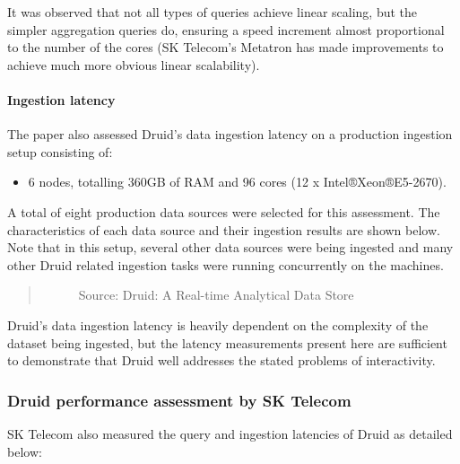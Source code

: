 \documentclass[letterpaper,10pt,english]{sphinxmanual}
\begin{document}
It was observed that not all types of queries achieve linear scaling, but the simpler aggregation queries do, ensuring a speed increment almost proportional to the number of the cores (SK Telecom’s Metatron has made improvements to achieve much more obvious linear scalability).


\paragraph{Ingestion latency}
\label{\detokenize{discovery/part01/druid_tests:ingestion-latency}}
The paper also assessed Druid’s data ingestion latency on a production ingestion setup consisting of:
\begin{itemize}
\item {} 
6 nodes, totalling 360GB of RAM and 96 cores (12 x Intel®Xeon®E5-2670).

\end{itemize}

A total of eight production data sources were selected for this assessment. The characteristics of each data source and their ingestion results are shown below. Note that in this setup, several other data sources were being ingested and many other Druid related ingestion tasks were running concurrently on the machines.
\begin{quote}

\begin{figure}[H]
\centering
\capstart

\noindent{}
\caption{Source: Druid: A Real-time Analytical Data Store}\label{\detokenize{discovery/part01/druid_tests:id14}}\end{figure}
\end{quote}

Druid’s data ingestion latency is heavily dependent on the complexity of the dataset being ingested, but the latency measurements present here are sufficient to demonstrate that Druid well addresses the stated problems of interactivity.


\subsubsection{Druid performance assessment by SK Telecom}
\label{\detokenize{discovery/part01/druid_tests:sk-druid}}
SK Telecom also measured the query and ingestion latencies of Druid as detailed below:
\end{document}
